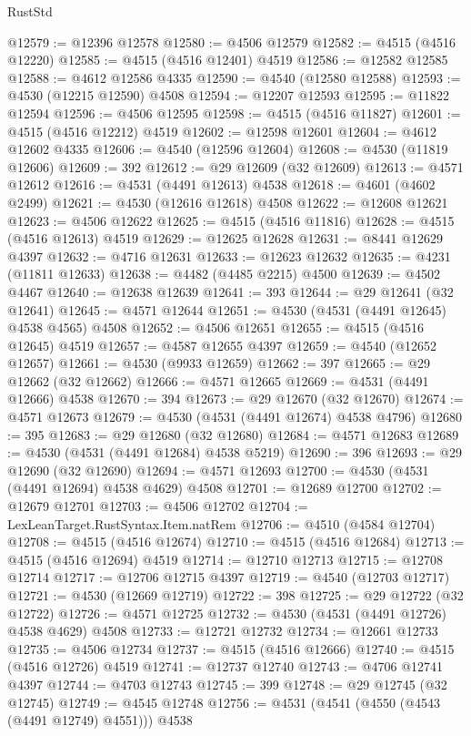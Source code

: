 \begin{lexlean}{RustStd}
\begin{coremodule}
@12579 := @12396 @12578
@12580 := @4506 @12579
@12582 := @4515 (@4516 @12220)
@12585 := @4515 (@4516 @12401) @4519
@12586 := @12582 @12585
@12588 := @4612 @12586 @4335
@12590 := @4540 (@12580 @12588)
@12593 := @4530 (@12215 @12590) @4508
@12594 := @12207 @12593
@12595 := @11822 @12594
@12596 := @4506 @12595
@12598 := @4515 (@4516 @11827)
@12601 := @4515 (@4516 @12212) @4519
@12602 := @12598 @12601
@12604 := @4612 @12602 @4335
@12606 := @4540 (@12596 @12604)
@12608 := @4530 (@11819 @12606)
@12609 := 392
@12612 := @29 @12609 (@32 @12609)
@12613 := @4571 @12612
@12616 := @4531 (@4491 @12613) @4538
@12618 := @4601 (@4602 @2499)
@12621 := @4530 (@12616 @12618) @4508
@12622 := @12608 @12621
@12623 := @4506 @12622
@12625 := @4515 (@4516 @11816)
@12628 := @4515 (@4516 @12613) @4519
@12629 := @12625 @12628
@12631 := @8441 @12629 @4397
@12632 := @4716 @12631
@12633 := @12623 @12632
@12635 := @4231 (@11811 @12633)
@12638 := @4482 (@4485 @2215) @4500
@12639 := @4502 @4467
@12640 := @12638 @12639
@12641 := 393
@12644 := @29 @12641 (@32 @12641)
@12645 := @4571 @12644
@12651 := @4530 (@4531 (@4491 @12645) @4538 @4565) @4508
@12652 := @4506 @12651
@12655 := @4515 (@4516 @12645) @4519
@12657 := @4587 @12655 @4397
@12659 := @4540 (@12652 @12657)
@12661 := @4530 (@9933 @12659)
@12662 := 397
@12665 := @29 @12662 (@32 @12662)
@12666 := @4571 @12665
@12669 := @4531 (@4491 @12666) @4538
@12670 := 394
@12673 := @29 @12670 (@32 @12670)
@12674 := @4571 @12673
@12679 := @4530 (@4531 (@4491 @12674) @4538 @4796)
@12680 := 395
@12683 := @29 @12680 (@32 @12680)
@12684 := @4571 @12683
@12689 := @4530 (@4531 (@4491 @12684) @4538 @5219)
@12690 := 396
@12693 := @29 @12690 (@32 @12690)
@12694 := @4571 @12693
@12700 := @4530 (@4531 (@4491 @12694) @4538 @4629) @4508
@12701 := @12689 @12700
@12702 := @12679 @12701
@12703 := @4506 @12702
@12704 := LexLeanTarget.RustSyntax.Item.natRem
@12706 := @4510 (@4584 @12704)
@12708 := @4515 (@4516 @12674)
@12710 := @4515 (@4516 @12684)
@12713 := @4515 (@4516 @12694) @4519
@12714 := @12710 @12713
@12715 := @12708 @12714
@12717 := @12706 @12715 @4397
@12719 := @4540 (@12703 @12717)
@12721 := @4530 (@12669 @12719)
@12722 := 398
@12725 := @29 @12722 (@32 @12722)
@12726 := @4571 @12725
@12732 := @4530 (@4531 (@4491 @12726) @4538 @4629) @4508
@12733 := @12721 @12732
@12734 := @12661 @12733
@12735 := @4506 @12734
@12737 := @4515 (@4516 @12666)
@12740 := @4515 (@4516 @12726) @4519
@12741 := @12737 @12740
@12743 := @4706 @12741 @4397
@12744 := @4703 @12743
@12745 := 399
@12748 := @29 @12745 (@32 @12745)
@12749 := @4545 @12748
@12756 := @4531 (@4541 (@4550 (@4543 (@4491 @12749) @4551))) @4538

\end{coremodule}
\end{lexlean}
